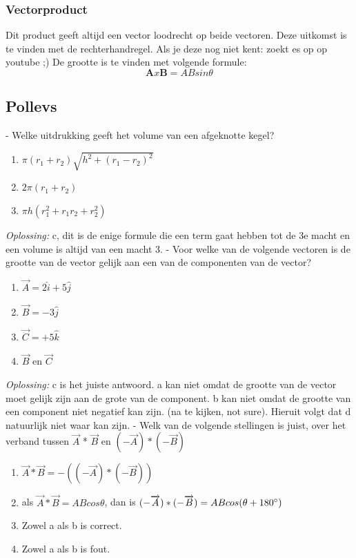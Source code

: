\documentclass[12pt,a4paper]{article}
\begin{document}
	\subsubsection{Vectorproduct}
	Dit product geeft altijd een vector loodrecht op beide vectoren. Deze uitkomst is te vinden met de rechterhandregel. Als je deze nog niet kent: zoekt es op op youtube ;) 
	De grootte is te vinden met volgende formule: 
	\[\textbf{A} x \textbf{B} = ABsin\theta\]
	
	\subsection{Pollevs}
	- Welke uitdrukking geeft het volume van een afgeknotte kegel?
	\begin{enumerate} [label=\alph*)]
		\item \(\pi(r_1 + r_2)\sqrt{h^2 + (r_1 - r_2)^2}\)
		\item \(2\pi(r_1 + r_2)\)
		\item \(\pi h(r_1^2 + r_1r_2 + r_2^2)\)
	\end{enumerate}
	\textit{Oplossing:} c, dit is de enige formule die een term gaat hebben tot de 3e macht en een volume is altijd van een macht 3. 
	\newline
	- Voor welke van de volgende vectoren is de grootte van de vector gelijk aan een van de componenten van de vector? 
	\begin{enumerate}[label = \alph*)]
		\item \(\overrightarrow{A} = 2\hat{i} + 5\hat{j}\)
		\item \(\overrightarrow{B} = -3\hat{j}\)
		\item \(\overrightarrow{C} = +5\hat{k}\)
		\item \(\overrightarrow{B} \text{ en } \overrightarrow{C}\)
	\end{enumerate}
	\textit{Oplossing:} c is het juiste antwoord. a kan niet omdat de grootte van de vector moet gelijk zijn aan de grote van de component. b kan niet omdat de grootte van een component niet negatief kan zijn. (na te kijken, not sure). Hieruit volgt dat d natuurlijk niet waar kan zijn. 
	\newline
	- Welk van de volgende stellingen is juist, over het verband tussen $\overrightarrow{A}$ * $\overrightarrow{B}$ en \((-\overrightarrow{A}) * (-\overrightarrow{B})\)
	\begin{enumerate}[label=\alph*)]
		\item \(\overrightarrow{A} * \overrightarrow{B} = -((-\overrightarrow{A})*(-\overrightarrow{B}))\)
		\item als \(\overrightarrow{A} * \overrightarrow{B} = ABcos\theta \), dan is \((-\overrightarrow{A}) * (-\overrightarrow{B}) = ABcos(\theta + 180\degree)\)
		\item Zowel a als b is correct. 
		\item Zowel a als b is fout. 
	\end{enumerate}
\end{document}
